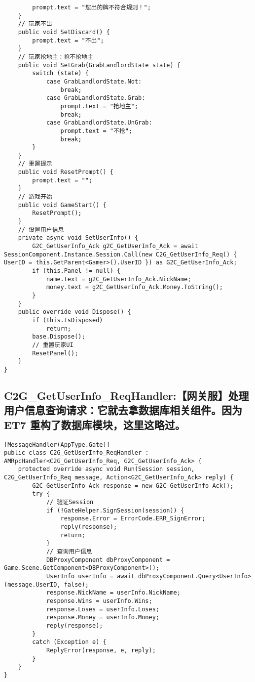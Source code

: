 \documentclass[9pt, b5paper]{article}
\begin{document}
\begin{itemize}
\begin{verbatim}
        prompt.text = "您出的牌不符合规则！";
    }
    // 玩家不出
    public void SetDiscard() {
        prompt.text = "不出";
    }
    // 玩家抢地主：抢不抢地主
    public void SetGrab(GrabLandlordState state) {
        switch (state) {
            case GrabLandlordState.Not:
                break;
            case GrabLandlordState.Grab:
                prompt.text = "抢地主";
                break;
            case GrabLandlordState.UnGrab:
                prompt.text = "不抢";
                break;
        }
    }
    // 重置提示
    public void ResetPrompt() {
        prompt.text = "";
    }
    // 游戏开始
    public void GameStart() {
        ResetPrompt();
    }
    // 设置用户信息
    private async void SetUserInfo() {
        G2C_GetUserInfo_Ack g2C_GetUserInfo_Ack = await SessionComponent.Instance.Session.Call(new C2G_GetUserInfo_Req() { UserID = this.GetParent<Gamer>().UserID }) as G2C_GetUserInfo_Ack;
        if (this.Panel != null) {
            name.text = g2C_GetUserInfo_Ack.NickName;
            money.text = g2C_GetUserInfo_Ack.Money.ToString();
        }
    }
    public override void Dispose() {
        if (this.IsDisposed) 
            return;
        base.Dispose();
        // 重置玩家UI
        ResetPanel();
    }
}
\end{verbatim}
\end{itemize}

\subsection{C2G\_GetUserInfo\_ReqHandler:【网关服】处理用户信息查询请求：它就去拿数据库相关组件。因为 ET7 重构了数据库模块，这里这略过。}
\label{sec-1-8}
\begin{verbatim}
[MessageHandler(AppType.Gate)]
public class C2G_GetUserInfo_ReqHandler : AMRpcHandler<C2G_GetUserInfo_Req, G2C_GetUserInfo_Ack> {
    protected override async void Run(Session session, C2G_GetUserInfo_Req message, Action<G2C_GetUserInfo_Ack> reply) {
        G2C_GetUserInfo_Ack response = new G2C_GetUserInfo_Ack();
        try {
            // 验证Session
            if (!GateHelper.SignSession(session)) {
                response.Error = ErrorCode.ERR_SignError;
                reply(response);
                return;
            }
            // 查询用户信息
            DBProxyComponent dbProxyComponent = Game.Scene.GetComponent<DBProxyComponent>();
            UserInfo userInfo = await dbProxyComponent.Query<UserInfo>(message.UserID, false);
            response.NickName = userInfo.NickName;
            response.Wins = userInfo.Wins;
            response.Loses = userInfo.Loses;
            response.Money = userInfo.Money;
            reply(response);
        }
        catch (Exception e) {
            ReplyError(response, e, reply);
        }
    }
}
\end{verbatim}
\end{document}

